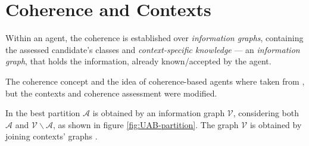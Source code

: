 





%


\section{Coherence and Contexts}
\label{section:coherence}


Within an agent, the coherence is established over \emph{information graphs},
containing the assessed candidate's classes and \emph{context-specific
  knowledge} --- an \emph{information graph}, that holds the information,
already known/accepted by the agent.

The coherence concept and the idea of coherence-based agents
where taken from \cite{UAB-Thesis}, but the contexts and
coherence assessment were modified.

In \cite{UAB-Thesis} the best partition $\mathcal{A}$ 
is obtained by an information graph $\mathcal{V}$, considering both
$\mathcal{A}$ and $\mathcal{V} \backslash \mathcal{A}$, as shown in figure
\ref{fig:UAB-partition}. The graph $\mathcal{V}$ is obtained by joining
contexts' graphs \cite[62]{UAB-Thesis}.

